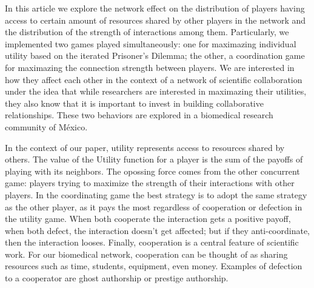 \documentclass[11pt]{article}
\begin{document}

 {\color{red}In this article we explore the network effect on the distribution
   of players having access to certain amount of resources shared by other players in the
   network and the distribution of the strength of interactions among
   them. Particularly, we implemented two games played simultaneously: 
   one for maximazing individual utility based on the iterated Prisoner's
   Dilemma; the other, a coordination game for maximazing the connection strength between
   players. We are interested in how they affect each other in 
   the context of a network of scientific collaboration under the idea that while
   researchers are interested in maximazing their utilities, they also know that
   it is important to invest in building collaborative relationships. These two
   behaviors are explored in a biomedical research community of M\'exico.}\\

{\color{red}In the context of our paper, utility represents
  access to resources shared by others.
  The value of the Utility function for a player is the sum of the payoffs of playing
  with its neighbors. The opossing force comes from the other concurrent game: players
  trying to maximize the strength of their interactions with other players. In the coordinating game
  the best strategy is to adopt the same strategy as the other player, as it pays the most
  regardless of cooperation or defection in the utility game. When
  both cooperate the interaction gets a positive payoff, when both defect, the
  interaction doesn't get affected; but if they anti-coordinate, then the
  interaction looses. Finally, cooperation is a central feature of scientific work.
  For our biomedical network, cooperation can be thought of
  as sharing resources such as time, students, equipment, even money. Examples of defection
  to a cooperator are ghost authorship or
  prestige authorship.


}
\end{document}
